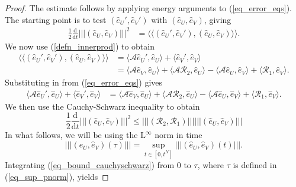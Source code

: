 \documentclass[12pt,a4paper]{article}
\numberwithin{equation}{section}
\theoremstyle{definition}
\newcommand{\pnorm}[1]{\left|\left|\left|#1\right|\right|\right|}
\newcommand{\leb}{\text{L}}
\newcommand{\innerprod}[1]{\langle\langle#1\rangle\rangle}
\newcommand{\innerprodsingle}[1]{\langle#1\rangle}
\newcommand{\qp}[1]{\left(#1\right)}
\newcommand{\qb}[1]{\left[#1\right]}
\begin{document}
\begin{proof}
The estimate follows by applying energy arguments to (\ref{eq_error_eqs}).  The starting point is to test $\qp{\hat{e}_U', \hat{e}_V'}$ with $\qp{\hat{e}_U, \hat{e}_V}$, giving
\begin{equation}
\begin{aligned}
\frac{1}{2}\frac{\mathrm{d}}{\mathrm{d}t}\pnorm{\qp{\hat{e}_U,\hat{e}_V}}^2
    &=\innerprod{\qp{\hat{e}_U', \hat{e}_V'}, \qp{\hat{e}_U, \hat{e}_V}}.
\end{aligned}
\end{equation}
We now use (\ref{defn_innerprod}) to obtain 
\begin{equation}
\begin{aligned}
\innerprod{\qp{\hat{e}_U', \hat{e}_V'}, \qp{\hat{e}_U, \hat{e}_V}}
&=\innerprodsingle{\mathcal{A}\hat{e}_U',\hat{e}_U}+\innerprodsingle{\hat{e}_V',\hat{e}_V}\\
&=\innerprodsingle{\mathcal{A}\hat{e}_V,\hat{e}_U}
+\innerprodsingle{\mathcal{A}\mathcal{R}_2,\hat{e}_U}
-\innerprodsingle{\mathcal{A}\hat{e}_U,\hat{e}_V}
+\innerprodsingle{\mathcal{R}_1,\hat{e}_V}.
\end{aligned}
\end{equation}
Substituting in from (\ref{eq_error_eqs}) gives 
\begin{equation}
\begin{aligned}
\innerprodsingle{\mathcal{A}\hat{e}_U',\hat{e}_U}+\innerprodsingle{\hat{e}_V',\hat{e}_V}&
=\innerprodsingle{\mathcal{A}\hat{e}_V,\hat{e}_U}
+\innerprodsingle{\mathcal{A}\mathcal{R}_2,\hat{e}_U}
-\innerprodsingle{\mathcal{A}\hat{e}_U,\hat{e}_V}
+\innerprodsingle{\mathcal{R}_1,\hat{e}_V}.
\end{aligned}
\end{equation}
We then use the Cauchy-Schwarz inequality to obtain
\begin{equation}\label{eq_bound_cauchyschwarz}
\frac{1}{2}\frac{\mathrm{d}}{\mathrm{d}t}\pnorm{\qp{\hat{e}_U,\hat{e}_V}}^2
  \leq  \pnorm{\qp{\mathcal{R}_2,\mathcal{R}_1}} \pnorm{\qp{\hat{e}_U,\hat{e}_V}}
\end{equation}
In what follows, we will be using the $\leb^\infty$ norm in time
\begin{equation}\label{eq_sup_pnorm}
\pnorm{\qp{\hat{e}_U, \hat{e}_V}\qp{\tau}}=\sup_{t\in\qb{0,t^N}}\pnorm{\qp{\hat{e}_U, \hat{e}_V}\qp{t}}.
\end{equation}
Integrating (\ref{eq_bound_cauchyschwarz}) from $0$ to $\tau$, where $\tau$ is defined in (\ref{eq_sup_pnorm}), yields

\end{proof}
\end{document}
